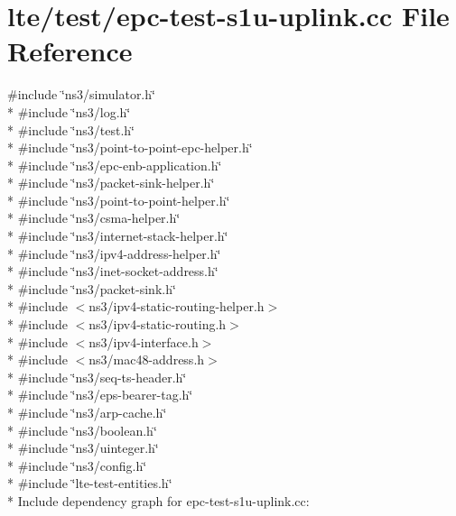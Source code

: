\hypertarget{epc-test-s1u-uplink_8cc}{}\section{lte/test/epc-\/test-\/s1u-\/uplink.cc File Reference}
\label{epc-test-s1u-uplink_8cc}
{\ttfamily \#include \char`\"{}ns3/simulator.\+h\char`\"{}}\\*
{\ttfamily \#include \char`\"{}ns3/log.\+h\char`\"{}}\\*
{\ttfamily \#include \char`\"{}ns3/test.\+h\char`\"{}}\\*
{\ttfamily \#include \char`\"{}ns3/point-\/to-\/point-\/epc-\/helper.\+h\char`\"{}}\\*
{\ttfamily \#include \char`\"{}ns3/epc-\/enb-\/application.\+h\char`\"{}}\\*
{\ttfamily \#include \char`\"{}ns3/packet-\/sink-\/helper.\+h\char`\"{}}\\*
{\ttfamily \#include \char`\"{}ns3/point-\/to-\/point-\/helper.\+h\char`\"{}}\\*
{\ttfamily \#include \char`\"{}ns3/csma-\/helper.\+h\char`\"{}}\\*
{\ttfamily \#include \char`\"{}ns3/internet-\/stack-\/helper.\+h\char`\"{}}\\*
{\ttfamily \#include \char`\"{}ns3/ipv4-\/address-\/helper.\+h\char`\"{}}\\*
{\ttfamily \#include \char`\"{}ns3/inet-\/socket-\/address.\+h\char`\"{}}\\*
{\ttfamily \#include \char`\"{}ns3/packet-\/sink.\+h\char`\"{}}\\*
{\ttfamily \#include $<$ns3/ipv4-\/static-\/routing-\/helper.\+h$>$}\\*
{\ttfamily \#include $<$ns3/ipv4-\/static-\/routing.\+h$>$}\\*
{\ttfamily \#include $<$ns3/ipv4-\/interface.\+h$>$}\\*
{\ttfamily \#include $<$ns3/mac48-\/address.\+h$>$}\\*
{\ttfamily \#include \char`\"{}ns3/seq-\/ts-\/header.\+h\char`\"{}}\\*
{\ttfamily \#include \char`\"{}ns3/eps-\/bearer-\/tag.\+h\char`\"{}}\\*
{\ttfamily \#include \char`\"{}ns3/arp-\/cache.\+h\char`\"{}}\\*
{\ttfamily \#include \char`\"{}ns3/boolean.\+h\char`\"{}}\\*
{\ttfamily \#include \char`\"{}ns3/uinteger.\+h\char`\"{}}\\*
{\ttfamily \#include \char`\"{}ns3/config.\+h\char`\"{}}\\*
{\ttfamily \#include \char`\"{}lte-\/test-\/entities.\+h\char`\"{}}\\*
Include dependency graph for epc-\/test-\/s1u-\/uplink.cc\+:
